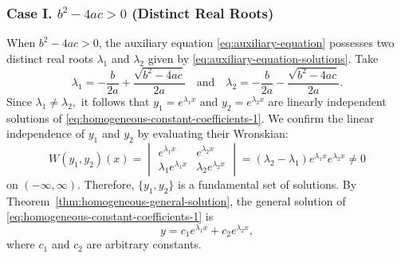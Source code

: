 \subsubsection{Case I. \(b^2-4ac>0\) (Distinct Real Roots)}		 	
	When \(b^2-4ac>0\), the auxiliary equation \eqref{eq:auxiliary-equation}  possesses two distinct real roots $\lambda_1$ and $\lambda_2$ given by \eqref{eq:auxiliary-equation-solutions}.
Take 
\begin{equation}\label{eq:auxiliary-equation-solutions-real}
	\lambda_1= -\frac{b}{2a}+ \frac{\sqrt{b^2-4ac}}{2a}
	\quad\mbox{and}\quad 
	\lambda_2=-\frac{b}{2a}- \frac{\sqrt{b^2-4ac}}{2a}.
\end{equation}Since $\lambda_1\ne \lambda_2,$ it follows that \(y_1=e^{\lambda_1x}\) and \(y_2=e^{\lambda_2x}\) are linearly independent solutions of \eqref{eq:homogeneous-constant-coefficients-1}. We  confirm the linear independence of  \(y_1\) and \(y_2\)  by evaluating  their Wronskian: 
	 \[W(y_1,y_2)(x) = \begin{vmatrix}
	 	e^{\lambda_1x}&e^{\lambda_2x}\\
	 \lambda_1	e^{\lambda_1x}&\lambda_2e^{\lambda_2x}
	 \end{vmatrix} = (\lambda_2-\lambda_1)e^{\lambda_1x} e^{\lambda_2x} \ne 0\]
	 on \((-\infty, \infty)\). Therefore, \(\{y_1, y_2\}\) is a fundamental set of solutions.  By Theorem~\ref{thm:homogeneous-general-solution}, the general solution of \eqref{eq:homogeneous-constant-coefficients-1} is 
	 \begin{equation}\label{eq:real-distict-general-solution}
	 	\boxed{y = c_1e^{\lambda_1x}+c_2e^{\lambda_2x},}
	 \end{equation}
	 	where $c_1$ and $c_2$ are arbitrary constants.
	 	
